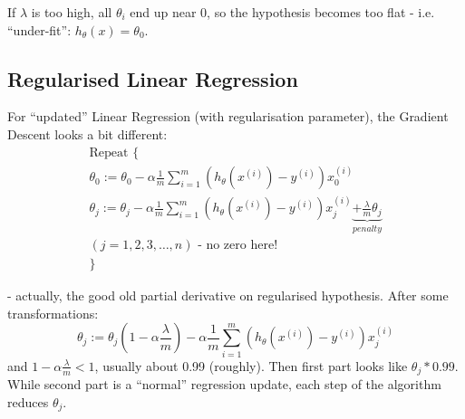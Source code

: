 \documentclass{scrartcl}
\begin{document}
If $\lambda$ is too high, all $\theta_i$ end up near 0, so the
hypothesis becomes too flat - i.e. ``under-fit'': $h_\theta(x) =
\theta_0$. 

\subsection{Regularised Linear Regression}
\label{sec:7-3}
For ``updated'' Linear Regression (with regularisation parameter), the
Gradient Descent looks a bit different:
\[ \begin{array}{l}
  \textrm{Repeat }  \{ \\
  \theta_0 := \theta_0 - \alpha \frac {1}{m} \sum
  \limits_{i=1}^m(h_\theta(x^{(i)}) - y^{(i)}) x_0^{(i)} \\
  \theta_j := \theta_j - \alpha \frac {1}{m} \sum
  \limits_{i=1}^m(h_\theta(x^{(i)}) - y^{(i)}) x_j^{(i)} \underbrace{+
  \frac{\lambda}{m}\theta_j } _{penalty} \\
  (j= 1, 2, 3, \dots , n) \textrm{ - no zero here!} \\
  \}
\end{array}
 \]

- actually, the good old partial derivative on regularised hypothesis.
After some transformations: \[
\theta_j := \theta_j(1 - \alpha\frac{\lambda}{m}) - \alpha \frac{1}{m}
\sum \limits_{i=1}^{m}(h_\theta(x^{(i)}) - y^{(i)})x_j^{(i)}
\] 
and $1 - \alpha \frac{\lambda}{m} < 1$, usually about 0.99 (roughly).
Then first part looks like $\theta_j * 0.99$. While second part is a
``normal'' regression update, each step of the algorithm reduces
$\theta_j$. 
\end{document}
